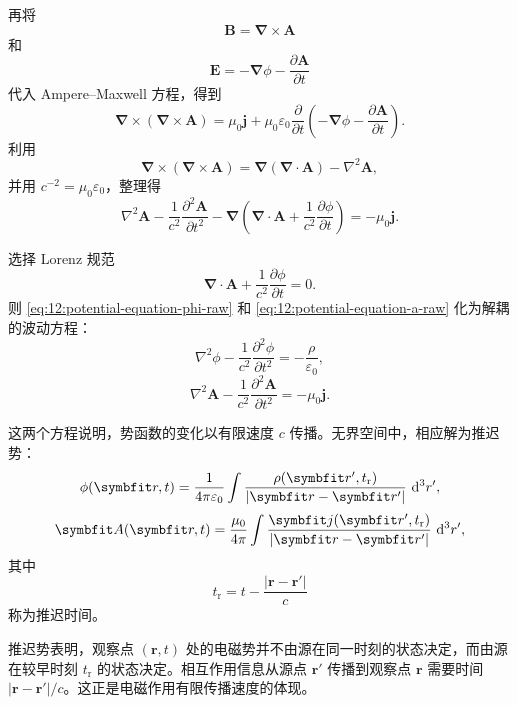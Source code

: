 再将
\[
\bm{B}
=
\bm{\nabla}\times\bm{A}
\]
和
\[
\bm{E}
=
-\bm{\nabla}\phi
-
\frac{\partial\bm{A}}{\partial t}
\]
代入 Ampere--Maxwell 方程，得到
\[
\bm{\nabla}\times(\bm{\nabla}\times\bm{A})
=
\mu_{0}\bm{j}
+
\mu_{0}\varepsilon_{0}
\frac{\partial}{\partial t}
\left(
-\bm{\nabla}\phi
-
\frac{\partial\bm{A}}{\partial t}
\right).
\]
利用
\[
\bm{\nabla}\times(\bm{\nabla}\times\bm{A})
=
\bm{\nabla}(\bm{\nabla}\cdot\bm{A})
-
\nabla^{2}\bm{A},
\]
并用 $c^{-2}=\mu_{0}\varepsilon_{0}$，整理得
\begin{equation}
	\nabla^{2}\bm{A}
	-
	\frac{1}{c^{2}}
	\frac{\partial^{2}\bm{A}}{\partial t^{2}}
	-
	\bm{\nabla}
	\left(
	\bm{\nabla}\cdot\bm{A}
	+
	\frac{1}{c^{2}}
	\frac{\partial\phi}{\partial t}
	\right)
	=
	-\mu_{0}\bm{j}.
	\label{eq:12:potential-equation-a-raw}
\end{equation}

选择 Lorenz 规范
\begin{equation}
	\bm{\nabla}\cdot\bm{A}
	+
	\frac{1}{c^{2}}
	\frac{\partial\phi}{\partial t}
	=
	0.
	\label{eq:12:lorenz-gauge}
\end{equation}
则 \eqref{eq:12:potential-equation-phi-raw} 和 \eqref{eq:12:potential-equation-a-raw} 化为解耦的波动方程：
\begin{equation}
	\nabla^{2}\phi
	-
	\frac{1}{c^{2}}
	\frac{\partial^{2}\phi}{\partial t^{2}}
	=
	-\frac{\rho}{\varepsilon_{0}},
	\label{eq:12:wave-equation-phi}
\end{equation}
\begin{equation}
	\nabla^{2}\bm{A}
	-
	\frac{1}{c^{2}}
	\frac{\partial^{2}\bm{A}}{\partial t^{2}}
	=
	-\mu_{0}\bm{j}.
	\label{eq:12:wave-equation-a}
\end{equation}

这两个方程说明，势函数的变化以有限速度 $c$ 传播。无界空间中，相应解为推迟势：
\begin{equation}
	\phi(\bm{r},t)
	=
	\frac{1}{4\pi\varepsilon_{0}}
	\int
	\frac{
		\rho(\bm{r}',t_{\mathrm{r}})
	}{
		|\bm{r}-\bm{r}'|
	}
	\,\dif^{3}r',
	\label{eq:12:retarded-potential-phi}
\end{equation}
\begin{equation}
	\bm{A}(\bm{r},t)
	=
	\frac{\mu_{0}}{4\pi}
	\int
	\frac{
		\bm{j}(\bm{r}',t_{\mathrm{r}})
	}{
		|\bm{r}-\bm{r}'|
	}
	\,\dif^{3}r',
	\label{eq:12:retarded-potential-a}
\end{equation}
其中
\[
t_{\mathrm{r}}
=
t
-
\frac{|\bm{r}-\bm{r}'|}{c}
\]
称为推迟时间。

推迟势表明，观察点 $(\bm{r},t)$ 处的电磁势并不由源在同一时刻的状态决定，而由源在较早时刻 $t_{\mathrm{r}}$ 的状态决定。相互作用信息从源点 $\bm{r}'$ 传播到观察点 $\bm{r}$ 需要时间 $|\bm{r}-\bm{r}'|/c$。这正是电磁作用有限传播速度的体现。

